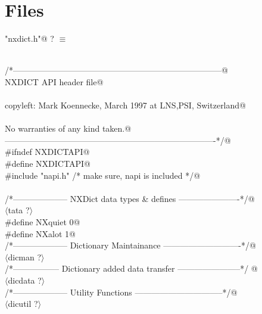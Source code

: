 \documentclass[12pt]{article}
\begin{document}
{\section{Files}
\begin{flushleft} \small
\begin{minipage}{\linewidth} \label{scrap41}
\verb@"nxdict.h"@ {\footnotesize ? }$\equiv$
\vspace{-1ex}
\begin{list}{}{} \item
\mbox{}\verb@@\\
\mbox{}\verb@/*---------------------------------------------------------------------------@\\
\mbox{}\verb@                            NXDICT API header file@\\
\mbox{}\verb@@\\
\mbox{}\verb@   copyleft: Mark Koennecke, March 1997 at LNS,PSI, Switzerland@\\
\mbox{}\verb@@\\
\mbox{}\verb@   No warranties of any kind taken.@\\
\mbox{}\verb@----------------------------------------------------------------------------*/@\\
\mbox{}\verb@#ifndef NXDICTAPI@\\
\mbox{}\verb@#define NXDICTAPI@\\
\mbox{}\verb@#include "napi.h" /* make sure, napi is included */@\\
\mbox{}\verb@@\\
\mbox{}\verb@/*-------------------- NXDict data types & defines ----------------------*/@\\
\mbox{}\verb@@$\langle$tata {\footnotesize ?}$\rangle$\verb@@\\
\mbox{}\verb@#define NXquiet 0@\\
\mbox{}\verb@#define NXalot  1@\\
\mbox{}\verb@/*-------------------- Dictionary Maintainance ----------------------------*/@\\
\mbox{}\verb@@$\langle$dicman {\footnotesize ?}$\rangle$\verb@@\\
\mbox{}\verb@/*----------------- Dictionary added data transfer -----------------------*/ @\\
\mbox{}\verb@@$\langle$dicdata {\footnotesize ?}$\rangle$\verb@@\\
\mbox{}\verb@/*-------------------- Utility Functions --------------------------------*/@\\
\mbox{}\verb@@$\langle$dicutil {\footnotesize ?}$\rangle$\verb@@\\

\end{list}
\end{minipage}
\end{flushleft}}
\end{document}
